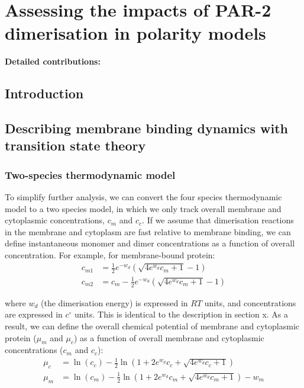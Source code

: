 \documentclass[12pt]{"report"}
\begin{document}
\clearpage
\chapter{Assessing the impacts of PAR-2 dimerisation in polarity models}

\textbf{Detailed contributions:}\\


\clearpage
\section{Introduction}

\clearpage
\section{Describing membrane binding dynamics with transition state theory}

\subsection{Two-species thermodynamic model} 

To simplify further analysis, we can convert the four species thermodynamic model to a two species model, in which we only track overall membrane and cytoplasmic concentrations, $c_m$ and $c_c$. If we assume that dimerisation reactions in the membrane and cytoplasm are fast relative to membrane binding, we can define instantaneous monomer and dimer concentrations as a function of overall concentration. For example, for membrane-bound protein:
\begin{align}
c_{m1} &= \frac{1}{2} e^{-w_d} \left(\sqrt{4e^{w_d} c_m + 1} - 1\right)\\
c_{m2} &= c_m - \frac{1}{2}e^{-w_d}\left(\sqrt{4e^{w_d} c_m + 1} - 1\right)
\end{align}

where $w_d$ (the dimerisation energy) is expressed in $RT$ units, and concentrations are expressed in $c^{\circ}$ units. This is identical to the description in section x. As a result, we can define the overall chemical potential of membrane and cytoplasmic protein ($\mu_m$ and $\mu_c$) as a function of overall membrane and cytoplasmic concentrations ($c_m$ and $c_c$):
\begin{align}
\mu_c &= \ln(c_c) - \frac{1}{2}\ln\left(1 + 2e^{w_d} c_c + \sqrt{4e^{w_d} c_c+ 1}\right)\\
\mu_m &= \ln(c_m) - \frac{1}{2}\ln\left(1 + 2e^{w_d} c_m + \sqrt{4e^{w_d} c_m + 1}\right) - w_m
\end{align}
\end{document}
